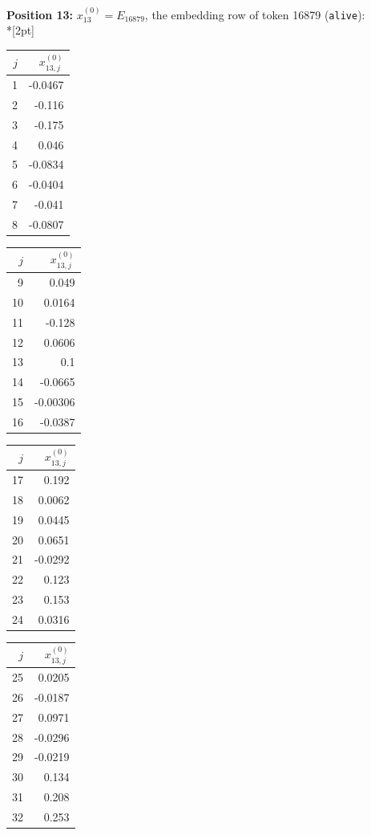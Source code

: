 \noindent \textbf{Position 13:} $x^{(0)}_{13} = E_{16879}$, the embedding row of token 16879 (\texttt{\textvisiblespace{}alive}):\\*[2pt]
{\tablefont \begin{tabular}[t]{r|r}
$j$ & $x^{(0)}_{13,j}$ \\\hline
1 & -0.0467 \\
2 & -0.116 \\
3 & -0.175 \\
4 & 0.046 \\
5 & -0.0834 \\
6 & -0.0404 \\
7 & -0.041 \\
8 & -0.0807
\end{tabular}\kern4pt
\begin{tabular}[t]{r|r}
$j$ & $x^{(0)}_{13,j}$ \\\hline
9 & 0.049 \\
10 & 0.0164 \\
11 & -0.128 \\
12 & 0.0606 \\
13 & 0.1 \\
14 & -0.0665 \\
15 & -0.00306 \\
16 & -0.0387
\end{tabular}\kern4pt
\begin{tabular}[t]{r|r}
$j$ & $x^{(0)}_{13,j}$ \\\hline
17 & 0.192 \\
18 & 0.0062 \\
19 & 0.0445 \\
20 & 0.0651 \\
21 & -0.0292 \\
22 & 0.123 \\
23 & 0.153 \\
24 & 0.0316
\end{tabular}\kern4pt
\begin{tabular}[t]{r|r}
$j$ & $x^{(0)}_{13,j}$ \\\hline
25 & 0.0205 \\
26 & -0.0187 \\
27 & 0.0971 \\
28 & -0.0296 \\
29 & -0.0219 \\
30 & 0.134 \\
31 & 0.208 \\
32 & 0.253
\end{tabular}\kern4pt
\begin{tabular}[t]{r|r}

\end{tabular}}
